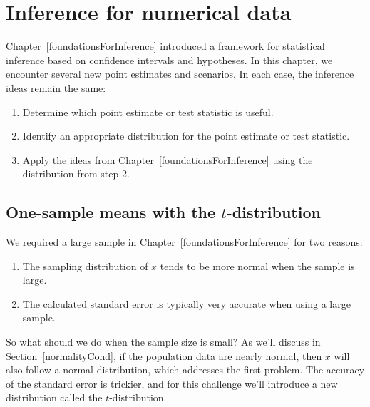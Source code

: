 \chapter{Inference for numerical data}
\label{inferenceForNumericalData}

Chapter~\ref{foundationsForInference} introduced a framework for statistical inference based on confidence intervals and hypotheses. In this chapter, we encounter several new point estimates and scenarios. In each case, the inference ideas remain the same:
\begin{enumerate}
\setlength{\itemsep}{0mm}
\item Determine which point estimate or test statistic is useful.
\item Identify an appropriate distribution for the point estimate or test statistic.
\item Apply the ideas from Chapter~\ref{foundationsForInference} using the distribution from step 2.
\end{enumerate}



\section[One-sample means with the $t$-distribution]{One-sample means with the $t$-distribution ~~}
\label{oneSampleMeansWithTDistribution}

We required a large sample in Chapter~\ref{foundationsForInference} for two reasons:
\begin{enumerate}
\setlength{\itemsep}{0mm}
\item The sampling distribution of $\bar{x}$ tends to be more normal when the sample is large.
\item The calculated standard error is typically very accurate when using a large sample.
\end{enumerate}
So what should we do when the sample size is small? As we'll discuss in Section~\ref{normalityCond}, if the population data are nearly normal, then $\bar{x}$ will also follow a normal distribution, which addresses the first problem. The accuracy of the standard error is trickier, and for this challenge we'll introduce a new distribution called the $t$-distribution.

